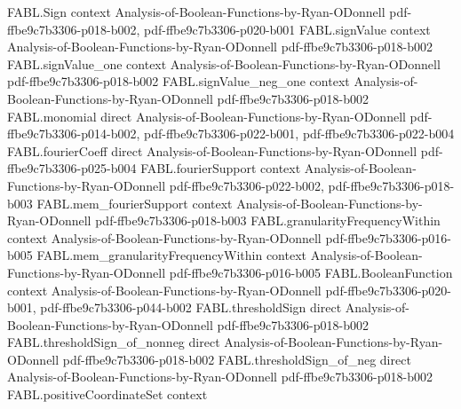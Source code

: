 \begin{theorem}
\label{FABL.eq_signValue_mul_discreteDerivative_add_coordinateExpectation}
\leanok
{}
\proofstep
  {FABL.Sign}
  {context}
  {Analysis-of-Boolean-Functions-by-Ryan-ODonnell}
  {pdf-ffbe9c7b3306-p018-b002,
    pdf-ffbe9c7b3306-p020-b001}
\proofstep
  {FABL.signValue}
  {context}
  {Analysis-of-Boolean-Functions-by-Ryan-ODonnell}
  {pdf-ffbe9c7b3306-p018-b002}
\proofstep
  {FABL.signValue_one}
  {context}
  {Analysis-of-Boolean-Functions-by-Ryan-ODonnell}
  {pdf-ffbe9c7b3306-p018-b002}
\proofstep
  {FABL.signValue_neg_one}
  {context}
  {Analysis-of-Boolean-Functions-by-Ryan-ODonnell}
  {pdf-ffbe9c7b3306-p018-b002}
\proofstep
  {FABL.monomial}
  {direct}
  {Analysis-of-Boolean-Functions-by-Ryan-ODonnell}
  {pdf-ffbe9c7b3306-p014-b002,
    pdf-ffbe9c7b3306-p022-b001,
    pdf-ffbe9c7b3306-p022-b004}
\proofstep
  {FABL.fourierCoeff}
  {direct}
  {Analysis-of-Boolean-Functions-by-Ryan-ODonnell}
  {pdf-ffbe9c7b3306-p025-b004}
\proofstep
  {FABL.fourierSupport}
  {context}
  {Analysis-of-Boolean-Functions-by-Ryan-ODonnell}
  {pdf-ffbe9c7b3306-p022-b002,
    pdf-ffbe9c7b3306-p018-b003}
\proofstep
  {FABL.mem_fourierSupport}
  {context}
  {Analysis-of-Boolean-Functions-by-Ryan-ODonnell}
  {pdf-ffbe9c7b3306-p018-b003}
\proofstep
  {FABL.granularityFrequencyWithin}
  {context}
  {Analysis-of-Boolean-Functions-by-Ryan-ODonnell}
  {pdf-ffbe9c7b3306-p016-b005}
\proofstep
  {FABL.mem_granularityFrequencyWithin}
  {context}
  {Analysis-of-Boolean-Functions-by-Ryan-ODonnell}
  {pdf-ffbe9c7b3306-p016-b005}
\proofstep
  {FABL.BooleanFunction}
  {context}
  {Analysis-of-Boolean-Functions-by-Ryan-ODonnell}
  {pdf-ffbe9c7b3306-p020-b001,
    pdf-ffbe9c7b3306-p044-b002}
\proofstep
  {FABL.thresholdSign}
  {direct}
  {Analysis-of-Boolean-Functions-by-Ryan-ODonnell}
  {pdf-ffbe9c7b3306-p018-b002}
\proofstep
  {FABL.thresholdSign_of_nonneg}
  {direct}
  {Analysis-of-Boolean-Functions-by-Ryan-ODonnell}
  {pdf-ffbe9c7b3306-p018-b002}
\proofstep
  {FABL.thresholdSign_of_neg}
  {direct}
  {Analysis-of-Boolean-Functions-by-Ryan-ODonnell}
  {pdf-ffbe9c7b3306-p018-b002}
\proofstep
  {FABL.positiveCoordinateSet}
  {context}

\end{theorem}
